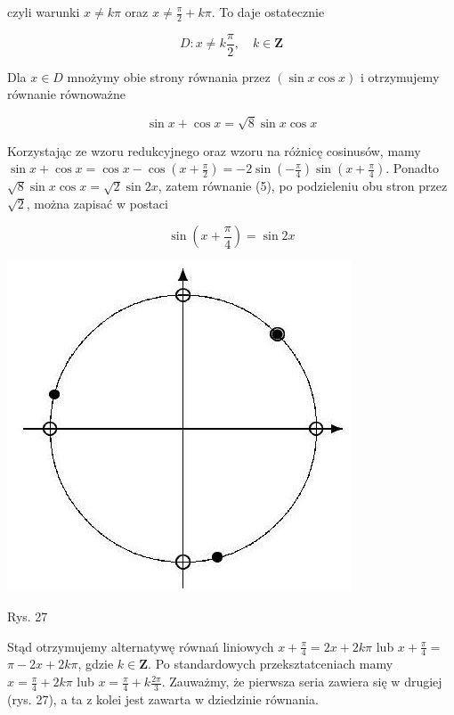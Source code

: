 \documentclass[10pt]{article}
\begin{document}
czyli warunki $x \neq k \pi$ oraz $x \neq \frac{\pi}{2}+k \pi$. To daje ostatecznie

$$
D: x \neq k \frac{\pi}{2}, \quad k \in \mathbf{Z}
$$

Dla $x \in D$ mnożymy obie strony równania przez $(\sin x \cos x)$ i otrzymujemy równanie równoważne

$$
\sin x+\cos x=\sqrt{8} \sin x \cos x
$$

Korzystając ze wzoru redukcyjnego oraz wzoru na różnicę cosinusów, mamy $\sin x+\cos x=\cos x-\cos \left(x+\frac{\pi}{2}\right)=-2 \sin \left(-\frac{\pi}{4}\right) \sin \left(x+\frac{\pi}{4}\right)$. Ponadto $\sqrt{8} \sin x \cos x=\sqrt{2} \sin 2 x$, zatem równanie (5), po podzieleniu obu stron przez $\sqrt{2}$, można zapisać w postaci

$$
\sin \left(x+\frac{\pi}{4}\right)=\sin 2 x
$$

\begin{center}
\includegraphics[max width=\textwidth]{2024_11_16_fe5b564401bf7db98894g-123}
\end{center}

Rys. 27

Stąd otrzymujemy alternatywę równań liniowych $x+\frac{\pi}{4}=2 x+2 k \pi$ lub $x+\frac{\pi}{4}=$ $\pi-2 x+2 k \pi$, gdzie $k \in \mathbf{Z}$. Po standardowych przeksztatceniach mamy $x=\frac{\pi}{4}+2 k \pi$ lub $x=\frac{\pi}{4}+k \frac{2 \pi}{3}$. Zauważmy, że pierwsza seria zawiera się w drugiej (rys. 27), a ta z kolei jest zawarta w dziedzinie równania.
\end{document}
